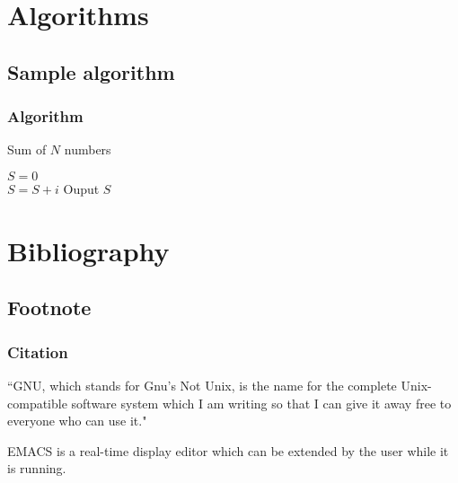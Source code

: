 \documentclass{beamer}
\begin{document}
\section{Algorithms}
\subsection{Sample algorithm}
\begin{frame}
	\frametitle{Algorithm}
	\begin{algorithm}[H]
		\caption{Sum of $N$ numbers}
		$S = 0$\\
		{
			$S = S + i$
		}
		Ouput $S$
	\end{algorithm}
\end{frame}

\section{Bibliography}
\subsection{Footnote}
\begin{frame}
	\frametitle{Citation} 
	\begin{block}{}
	``GNU, which stands for Gnu's Not Unix, is 
	the name for the complete Unix-compatible software system which 
	I am writing so that I can give it away free to everyone who can 
	use it\footnotemark."
	\end{block}
	EMACS is a real-time display editor which can be extended by the 
	user while it is running.
\end{frame}



\end{document}
